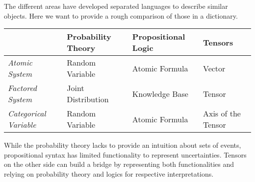 The different areas have developed separated languages to describe similar objects.
Here we want to provide a rough comparison of those in a dictionary.

\begin{tabular}{l|l|l|l}
						& \textbf{Probability Theory}  					& \textbf{Propositional Logic} 			& \textbf{Tensors} \\
	\hline
	\textit{Atomic System} 	& Random Variable 		& Atomic Formula 		& Vector \\
	\textit{Factored System} 	& Joint Distribution 		& Knowledge Base 		& Tensor \\
	\textit{Categorical Variable} & Random Variable 	& Atomic Formula 		& Axis of the Tensor
\end{tabular}

While the probability theory lacks to provide an intuition about sets of events, propositional syntax has limited functionality to represent uncertainties.
Tensors on the other side can build a bridge by representing both functionalities and relying on probability theory and logics for respective interpretations.







